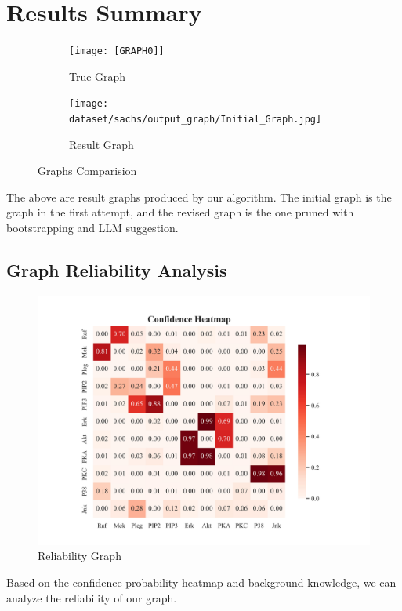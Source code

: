 \documentclass{article}
\begin{document}
\section{Results Summary}

\begin{figure}[H]
    \centering

    \begin{subfigure}{0.4\textwidth}
        \centering
        \texttt{[image: [GRAPH0]]}
        \caption{True Graph}
        \label{fig:sub1}
    \end{subfigure}
    \hspace{0.01\textwidth}  %

    \begin{subfigure}{0.4\textwidth}
        \centering
        \texttt{[image: dataset/sachs/output\_graph/Initial\_Graph.jpg]}
        \caption{Result Graph}
        \label{fig:sub2}
    \end{subfigure}

    \caption{Graphs Comparision}
    \label{fig:main}
\end{figure}

The above are result graphs produced by our algorithm.
The initial graph is the graph in the first attempt, and the revised graph is the one pruned with bootstrapping and LLM suggestion.

\subsection{Graph Reliability Analysis}

\begin{figure}[H]
        \centering
        \includegraphics[width=0.6\linewidth]{dataset/sachs/output_graph/confidence_heatmap.jpg}
        \caption{Reliability Graph}
        \label{fig:sub3}
\end{figure}

Based on the confidence probability heatmap and background knowledge, we can analyze the reliability of our graph.
\end{document}
